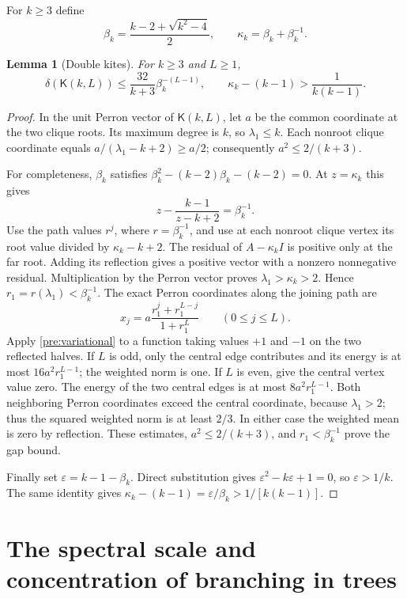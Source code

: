 \documentclass[11pt,a4paper]{article}
\numberwithin{equation}{section}
\newtheorem{lemma}[theorem]{Lemma}
\theoremstyle{definition}
\theoremstyle{remark}
\newcommand{\Kite}{\mathsf{K}}
\begin{document}
For $k\ge3$ define
\begin{equation}\label{bench:clique-parameters}
 \beta_k=\frac{k-2+\sqrt{k^2-4}}2,\qquad
 \kappa_k=\beta_k+\beta_k^{-1}.
\end{equation}
\begin{lemma}[Double kites]\label{bench:kite}
For $k\ge3$ and $L\ge1$,
\begin{equation}\label{bench:kite-bound}
 \delta(\Kite(k,L))\le\frac{32}{k+3}\beta_k^{-(L-1)},
 \qquad \kappa_k-(k-1)>\frac1{k(k-1)}.
\end{equation}
\end{lemma}
\begin{proof}
In the unit Perron vector of $\Kite(k,L)$, let $a$ be the common
coordinate at the two clique roots. Its maximum degree is $k$, so
$\lambda_1\le k$. Each nonroot clique coordinate equals
$a/(\lambda_1-k+2)\ge a/2$; consequently $a^2\le2/(k+3)$.

For completeness, $\beta_k$ satisfies
$\beta_k^2-(k-2)\beta_k-(k-2)=0$. At $z=\kappa_k$ this gives
\[
 z-\frac{k-1}{z-k+2}=\beta_k^{-1}.
\]
Use the path values $r^j$, where $r=\beta_k^{-1}$, and use at each
nonroot clique vertex its root value divided by $\kappa_k-k+2$.
The residual of $A-\kappa_kI$ is positive only at the far root.
Adding its reflection gives a positive vector with a nonzero nonnegative
residual. Multiplication by the Perron vector proves
$\lambda_1>\kappa_k>2$. Hence $r_1=r(\lambda_1)<\beta_k^{-1}$.
The exact Perron coordinates along the joining path are
\[
 x_j=a\frac{r_1^j+r_1^{L-j}}{1+r_1^L}
 \qquad(0\le j\le L).
\]
Apply \eqref{pre:variational} to a function taking values $+1$ and $-1$
on the two reflected halves. If $L$ is odd, only the central edge
contributes and its energy is at most $16a^2r_1^{L-1}$; the weighted
norm is one. If $L$ is even, give the central vertex value zero.
The energy of the two central edges is at most $8a^2r_1^{L-1}$.
Both neighboring Perron coordinates exceed the central coordinate,
because $\lambda_1>2$; thus the squared weighted norm is at least $2/3$.
In either case the weighted mean is zero by reflection. These estimates,
$a^2\le2/(k+3)$, and $r_1<\beta_k^{-1}$ prove the gap bound.

Finally set $\varepsilon=k-1-\beta_k$. Direct substitution gives
$\varepsilon^2-k\varepsilon+1=0$, so $\varepsilon>1/k$.
The same identity gives
$\kappa_k-(k-1)=\varepsilon/\beta_k>1/[k(k-1)]$.
\end{proof}

\section{The spectral scale and concentration of branching in trees}
\label{tree:scale-section}
\end{document}
